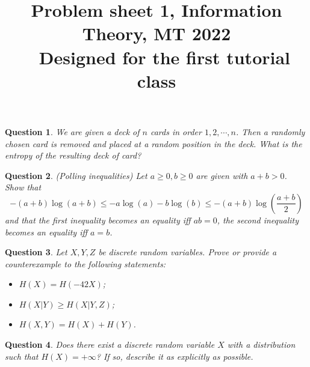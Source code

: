 \documentclass[11pt]{article}
\title{\sc   Problem sheet 1,  Information Theory, MT 2022\\\
\medskip
{\Large  Designed for the first tutorial class} }
\date{}
\author{}
\newtheorem{qu}{Question }
\begin{document}
\maketitle



\begin{qu}\label{chmsr}
\rm
We are given a deck of $n$ cards in order $1,2, \cdots, n$. Then a randomly chosen card is removed and placed at a random position in the deck. What is the entropy of the resulting deck of card?
\end{qu}


\bigskip
\bigskip


\begin{qu}\label{polling}\rm
(Polling inequalities)
Let $a\ge 0, b\ge 0$ are given with $a+b>0$. Show that 
$$-(a+b)\log(a+b)\le -a\log(a)-b\log(b)\le -(a+b)\log(\frac{a+b}{2})$$
and that the first inequality becomes an equality iff $ab=0$, the second inequality 
becomes an equality iff $a=b$. 
\end{qu}


\begin{qu}\rm
Let $X,Y,Z$ be discrete  random variables.  Prove or provide a counterexample to the following statements:
\begin{itemize}
\item [(a)] $H(X)=H(−42X)$;
\item [(b)] $H(X|Y)\ge  H(X|Y,Z)$;
\item [ (c)]  $H(X,Y)=H(X)+H(Y)$.
\end{itemize}
\end{qu}

\bigskip
\bigskip


\begin{qu}\rm
Does there exist a discrete random variable $X$ with a distribution such that $H(X) =+\infty$? If so, describe it as explicitly as possible.
\end{qu}

\bigskip
\bigskip
\end{document}
